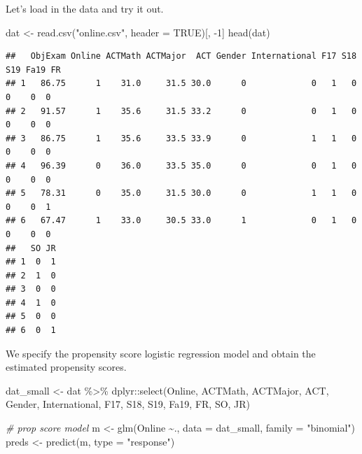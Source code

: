 \documentclass[
  ignorenonframetext,
]{beamer}
\newenvironment{Shaded}{\begin{snugshade}}{\end{snugshade}}
\newcommand{\AttributeTok}[1]{\textcolor[rgb]{0.77,0.63,0.00}{#1}}
\newcommand{\CommentTok}[1]{\textcolor[rgb]{0.56,0.35,0.01}{\textit{#1}}}
\newcommand{\ConstantTok}[1]{\textcolor[rgb]{0.00,0.00,0.00}{#1}}
\newcommand{\DecValTok}[1]{\textcolor[rgb]{0.00,0.00,0.81}{#1}}
\newcommand{\FunctionTok}[1]{\textcolor[rgb]{0.00,0.00,0.00}{#1}}
\newcommand{\NormalTok}[1]{#1}
\newcommand{\OtherTok}[1]{\textcolor[rgb]{0.56,0.35,0.01}{#1}}
\newcommand{\SpecialCharTok}[1]{\textcolor[rgb]{0.00,0.00,0.00}{#1}}
\newcommand{\StringTok}[1]{\textcolor[rgb]{0.31,0.60,0.02}{#1}}
\begin{document}
\begin{frame}[fragile]{}
\protect\hypertarget{section-15}{}
Let's load in the data and try it out.

\vspace{12pt}
\tiny

\begin{Shaded}
\begin{Highlighting}[]
\NormalTok{dat }\OtherTok{\textless{}{-}} \FunctionTok{read.csv}\NormalTok{(}\StringTok{"online.csv"}\NormalTok{, }\AttributeTok{header =} \ConstantTok{TRUE}\NormalTok{)[, }\SpecialCharTok{{-}}\DecValTok{1}\NormalTok{]}
\FunctionTok{head}\NormalTok{(dat)}
\end{Highlighting}
\end{Shaded}

\begin{verbatim}
##   ObjExam Online ACTMath ACTMajor  ACT Gender International F17 S18 S19 Fa19 FR
## 1   86.75      1    31.0     31.5 30.0      0             0   1   0   0    0  0
## 2   91.57      1    35.6     31.5 33.2      0             0   1   0   0    0  0
## 3   86.75      1    35.6     33.5 33.9      0             1   1   0   0    0  0
## 4   96.39      0    36.0     33.5 35.0      0             0   1   0   0    0  0
## 5   78.31      0    35.0     31.5 30.0      0             1   1   0   0    0  1
## 6   67.47      1    33.0     30.5 33.0      1             0   1   0   0    0  0
##   SO JR
## 1  0  1
## 2  1  0
## 3  0  0
## 4  1  0
## 5  0  0
## 6  0  1
\end{verbatim}

\vspace{12pt}
\normalsize

We specify the propensity score logistic regression model and obtain the
estimated propensity scores.

\vspace{12pt}
\tiny

\begin{Shaded}
\begin{Highlighting}[]
\NormalTok{dat\_small }\OtherTok{\textless{}{-}}\NormalTok{ dat }\SpecialCharTok{\%\textgreater{}\%} 
\NormalTok{  dplyr}\SpecialCharTok{::}\FunctionTok{select}\NormalTok{(Online, ACTMath, ACTMajor, ACT, Gender,}
\NormalTok{                International, F17, S18, S19, Fa19, FR, SO, JR)}

\CommentTok{\# prop score model}
\NormalTok{m }\OtherTok{\textless{}{-}} \FunctionTok{glm}\NormalTok{(Online }\SpecialCharTok{\textasciitilde{}}\NormalTok{., }\AttributeTok{data =}\NormalTok{ dat\_small, }\AttributeTok{family =} \StringTok{"binomial"}\NormalTok{)}
\NormalTok{preds }\OtherTok{\textless{}{-}} \FunctionTok{predict}\NormalTok{(m, }\AttributeTok{type =} \StringTok{"response"}\NormalTok{)}
\end{Highlighting}
\end{Shaded}
\end{frame}
\end{document}
